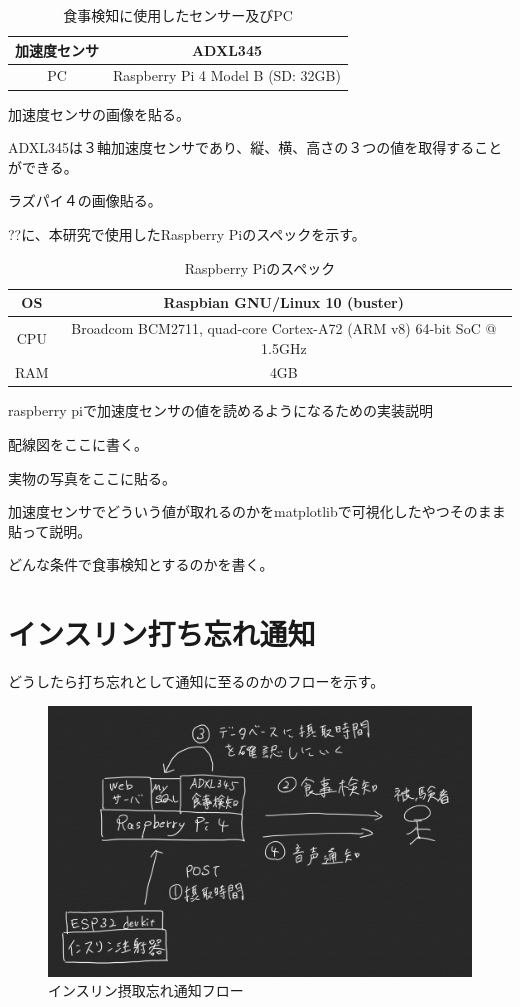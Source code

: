 \begin{table}[htbp]
  \caption{食事検知に使用したセンサー及びPC}
  \label{tb:meal_detection_spec}
  \begin{center}
    \begin{tabular}{c||c}
      \hline
      加速度センサ & ADXL345 \\\hline
      PC & Raspberry Pi 4 Model B (SD: 32GB) \\\hline
    \end{tabular}
  \end{center}
\end{table}

加速度センサの画像を貼る。

ADXL345は３軸加速度センサであり、縦、横、高さの３つの値を取得することができる。

ラズパイ４の画像貼る。

??に、本研究で使用したRaspberry Piのスペックを示す。

\begin{table}[htbp]
  \caption{Raspberry Piのスペック}
  \label{tb:raspberry_pi_spec}
  \begin{center}
    \begin{tabular}{c||c}
      \hline
      OS  & Raspbian GNU/Linux 10 (buster) \\\hline
      CPU & Broadcom BCM2711, quad-core Cortex-A72 (ARM v8) 64-bit SoC @ 1.5GHz \\\hline
      RAM & 4GB \\\hline
    \end{tabular}
  \end{center}
\end{table}

raspberry piで加速度センサの値を読めるようになるための実装説明

配線図をここに書く。

実物の写真をここに貼る。

加速度センサでどういう値が取れるのかをmatplotlibで可視化したやつそのまま貼って説明。

どんな条件で食事検知とするのかを書く。

\section{インスリン打ち忘れ通知}

どうしたら打ち忘れとして通知に至るのかのフローを示す。

\begin{figure}[htbp]
  \caption{インスリン摂取忘れ通知フロー}
  \label{fig:system_flow}
  \begin{center}
    \includegraphics[bb=0 0 1000 600,width=15cm]{assets/system_flow.png}
  \end{center}
\end{figure}
